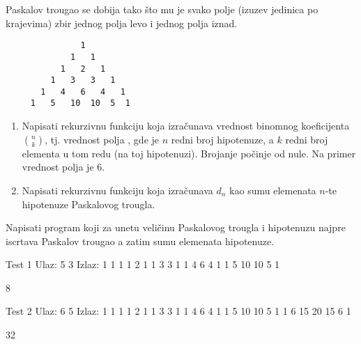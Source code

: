 \begin{Exercise}[label=108, difficulty=1]
 Paskalov trougao se dobija tako što mu je svako polje
(izuzev jedinica po krajevima) zbir jednog polja levo i
jednog polja iznad.
\begin{verbatim}
               1
             1   1
           1   2   1
         1   3   3   1
       1   4   6   4   1
     1   5   10  10  5  1
\end{verbatim}
\begin{enumerate}
\item Napisati rekurzivnu funkciju koja izračunava vrednost binomnog koeficijenta $\binom{n}{k}$, tj. vrednost polja , gde je $n$ redni broj hipotenuze, a $k$ redni broj elementa u tom redu (na toj hipotenuzi). Brojanje počinje od nule. Na primer vrednost polja  je $6$. 
\item Napisati rekurzivnu funkciju koja izračunava $d_n$ kao sumu elemenata $n$-te hipotenuze Paskalovog trougla.
\end{enumerate}

Napisati program koji za unetu veličinu Paskalovog trougla i hipotenuzu 
najpre iscrtava Paskalov trougao a zatim sumu elemenata hipotenuze.

\begin{miditest}
\begin{test}{Test 1}
Ulaz:   5 3
Izlaz:  
               1
             1   1
           1   2   1
         1   3   3   1
       1   4   6   4   1
     1   5   10  10  5  1

     8
\end{test}
\end{miditest}
\begin{miditest}
\begin{test}{Test 2}
Ulaz:   6 5
Izlaz:  
  		           1
               1   1
             1   2   1
           1   3   3   1
         1   4   6   4   1
       1   5   10  10   5  1
     1   6  15   20  15  6   1

     32
\end{test}
\end{miditest}

\end{Exercise}
\begin{Answer}[ref=108]
\end{Answer}



